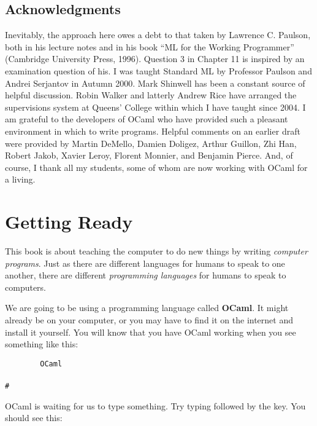 \documentclass[]{book}
\newcommand{\smspace}{\vspace{4mm}}
\begin{document}
\section*{Acknowledgments}

Inevitably, the approach here owes a debt to that taken by Lawrence C. Paulson, both in his lecture notes and in his book ``ML for the Working Programmer'' (Cambridge University Press, 1996). Question 3 in Chapter 11 is inspired by an examination question of his. I was taught Standard ML by Professor Paulson and Andrei Serjantov in Autumn 2000. Mark Shinwell has been a constant source of helpful discussion. Robin Walker and latterly Andrew Rice have arranged the supervisions system at Queens' College within which I have taught since 2004. I am grateful to the developers of OCaml who have provided such a pleasant environment in which to write programs. Helpful comments on an earlier draft were provided by Martin DeMello, Damien Doligez, Arthur Guillon, Zhi Han, Robert Jakob, Xavier Leroy, Florent Monnier, and Benjamin Pierce. And, of course, I thank all my students, some of whom are now working with OCaml for a living.

\pagestyle{empty}


\chapter{Getting Ready}

This book is about teaching the computer to do new things by writing \textit{computer programs}. Just as there are different languages for humans to speak to one another, there are different \textit{programming languages} for humans to speak to computers.

We are going to be using a programming language called \textbf{OCaml}. It might already be on your computer, or you may have to find it on the internet and install it yourself. You will know that you have OCaml working when you see something like this:

\smspace
\noindent\verb!        OCaml!\\
\noindent\\
\noindent\verb!#!
\smspace


{\setlength\fboxsep{1.75pt}%

\noindent OCaml is waiting for us to type something. Try typing  followed by the  key. You should see this:

}
\end{document}
